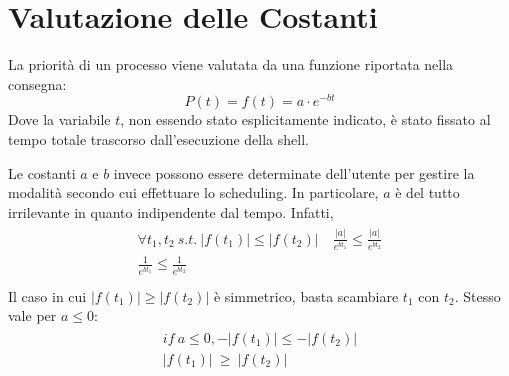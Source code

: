 \documentclass[11pt]{article}
\begin{document}
\section{Valutazione delle Costanti}

La priorit\`a di un processo viene valutata da una funzione riportata nella consegna:
$$
P(t) = f(t) = a \cdot e^{-bt}
$$
Dove la variabile $t$, non essendo stato esplicitamente indicato, \`e stato fissato al tempo totale
 trascorso dall'esecuzione della shell.

Le costanti $a$ e $b$  invece possono essere determinate dell'utente per gestire la
modalit\`a secondo cui effettuare lo scheduling. In particolare, $a$ \`e del tutto irrilevante
in quanto indipendente dal tempo.
Infatti,
\begin{align}
\begin{split}
 \forall t_1, t_2\ s.t.\ |f(t_1)| \le |f(t_2)| \quad \frac{|a|}{e^{bt_1}} \le \frac{|a|}{e^{bt_2}} \\
  \frac{1}{e^{bt_1}} \le \frac{1}{e^{bt_2}}\\
\end{split}
\end{align}
Il caso in cui $|f(t_1)| \ge |f(t_2)| $ \`e simmetrico, basta scambiare $t_1$ con $t_2$. Stesso vale per
$a \le 0$:
\begin{align}
\begin{split}
 if\ a \le 0, -|f(t_1)| \le -|f(t_2)| \\
 			   |f(t_1)|\ \ge\ |f(t_2)|
\end{split}
\end{align}
\end{document}
